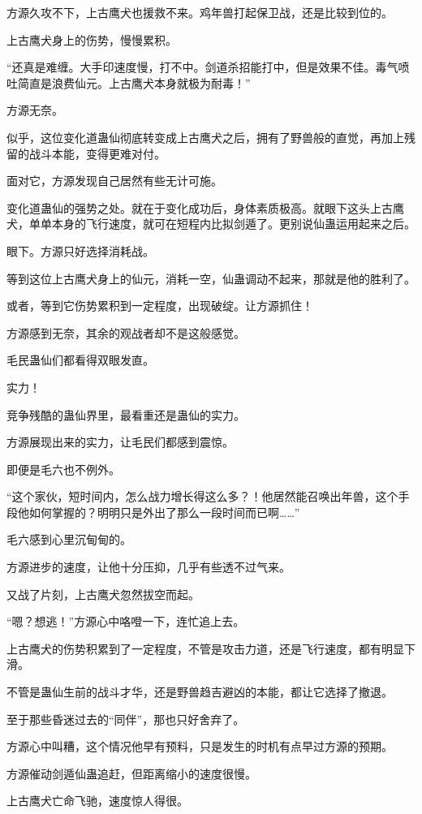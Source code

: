 \begin{this_body}
方源久攻不下，上古鹰犬也援救不来。鸡年兽打起保卫战，还是比较到位的。

上古鹰犬身上的伤势，慢慢累积。

“还真是难缠。大手印速度慢，打不中。剑道杀招能打中，但是效果不佳。毒气喷吐简直是浪费仙元。上古鹰犬本身就极为耐毒！”

方源无奈。

似乎，这位变化道蛊仙彻底转变成上古鹰犬之后，拥有了野兽般的直觉，再加上残留的战斗本能，变得更难对付。

面对它，方源发现自己居然有些无计可施。

变化道蛊仙的强势之处。就在于变化成功后，身体素质极高。就眼下这头上古鹰犬，单单本身的飞行速度，就可在短程内比拟剑遁了。更别说仙蛊运用起来之后。

眼下。方源只好选择消耗战。

等到这位上古鹰犬身上的仙元，消耗一空，仙蛊调动不起来，那就是他的胜利了。

或者，等到它伤势累积到一定程度，出现破绽。让方源抓住！

方源感到无奈，其余的观战者却不是这般感觉。

毛民蛊仙们都看得双眼发直。

实力！

竞争残酷的蛊仙界里，最看重还是蛊仙的实力。

方源展现出来的实力，让毛民们都感到震惊。

即便是毛六也不例外。

“这个家伙，短时间内，怎么战力增长得这么多？！他居然能召唤出年兽，这个手段他如何掌握的？明明只是外出了那么一段时间而已啊……”

毛六感到心里沉甸甸的。

方源进步的速度，让他十分压抑，几乎有些透不过气来。

又战了片刻，上古鹰犬忽然拔空而起。

“嗯？想逃！”方源心中咯噔一下，连忙追上去。

上古鹰犬的伤势积累到了一定程度，不管是攻击力道，还是飞行速度，都有明显下滑。

不管是蛊仙生前的战斗才华，还是野兽趋吉避凶的本能，都让它选择了撤退。

至于那些昏迷过去的“同伴”，那也只好舍弃了。

方源心中叫糟，这个情况他早有预料，只是发生的时机有点早过方源的预期。

方源催动剑遁仙蛊追赶，但距离缩小的速度很慢。

上古鹰犬亡命飞驰，速度惊人得很。


\end{this_body}

